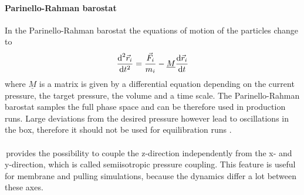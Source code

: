 \paragraph{Parinello-Rahman barostat}
In the Parinello-Rahman barostat \autocites{parinelloBarostat}{parinelloBarostat2} the equations of motion of the particles change to
\begin{equation}
\frac{\text{d}^2 \vec{r}_i}{\text{d} t^2} = \frac{\vec{F}_i}{m_i} - \underline{M} \frac{\text{d} \vec{r}_i}{\text{d} t}
\end{equation}
where $\underline{M}$ is a matrix is given by a differential equation depending on the current pressure, the target pressure, the volume and a time scale. The Parinello-Rahman barostat samples the full phase space and can be therefore used in production runs. Large deviations from the desired pressure however lead to oscillations in the box, therefore it should not be used for equilibration runs \autocite[p. 36]{gromacsManual}.\\
\\
\gromacs\,provides the possibility to couple the z-direction independently from the x- and y-direction, which is called semiisotropic pressure coupling. This feature is useful for membrane and pulling simulations, because the dynamics differ a lot between these axes.
